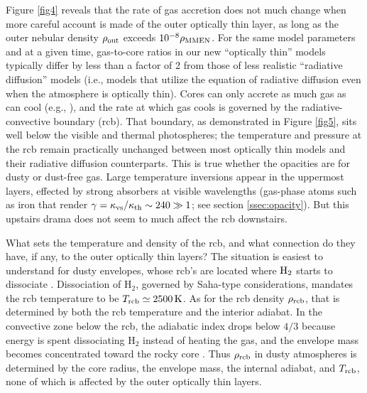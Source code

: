 \documentclass[fleqn,useAMS,usenatbib]{mnras}
\begin{document}
Figure \ref{fig4} reveals that the rate of gas accretion
does not much change when more careful
account is made of the outer optically thin
layer, as long as the outer nebular density $\rho_{\rm out}$ exceeds
$10^{-8} \rho_{\rm MMEN}$. 
For the same model parameters and at a given time, 
gas-to-core ratios in our new ``optically thin'' models
typically differ by less than a factor of 2 
from those of less realistic ``radiative diffusion'' models
(i.e., models that utilize the equation of radiative diffusion
even when the atmosphere is optically thin).
Cores can only accrete as much gas as can cool
(e.g., \citealt{paper2}), and the rate at which gas cools
is governed by the radiative-convective boundary (rcb).
That boundary, as demonstrated in Figure \ref{fig5}, 
sits well below the visible and thermal photospheres;
the temperature and pressure at the rcb remain practically unchanged
between most optically thin models and their radiative diffusion counterparts.
This is true whether the opacities are for dusty or dust-free gas.
Large temperature inversions appear in the uppermost layers,
effected by strong absorbers at visible wavelengths
(gas-phase atoms such as iron that render
$\gamma = \kappa_{\rm vs}/\kappa_{\rm th} \sim 240 \gg 1$; see section
\ref{ssec:opacity}). But this upstairs drama does not seem to much
affect the rcb downstairs. 

What sets the temperature and density of the rcb, and what connection
do they have, if any, to the outer optically thin layers?
The situation is easiest to understand for dusty envelopes,
whose rcb's are located where ${\rm H}_2$ starts to dissociate
\citep{paper1}.  Dissociation of H$_2$,
governed by Saha-type considerations,
mandates the rcb temperature to be $T_{\rm rcb} \simeq 2500\,{\rm K}$. 
As for the rcb density $\rho_{\rm rcb}$, that
is determined by 
both the rcb temperature and 
the interior adiabat.
In the convective zone below the rcb, the adiabatic index drops below
$4/3$ because energy is spent dissociating H$_2$ instead of heating the gas,
and the envelope mass
becomes concentrated toward the rocky core \citep{paper2}.  Thus 
$\rho_{\rm rcb}$ in dusty atmospheres is determined by the core radius,
the envelope mass, the internal adiabat, 
and $T_{\rm rcb}$,
none of which is
affected by the outer optically thin layers.
\end{document}
